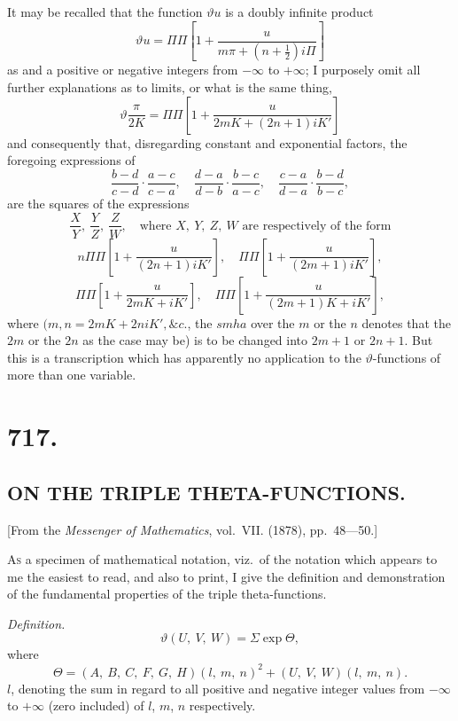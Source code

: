 \documentclass[12pt,a4paper,oneside]{book}
\theoremstyle{plain}
\theoremstyle{definition}
\theoremstyle{remark}
\begin{document}
It may be recalled that the function $\vartheta u$ is a doubly infinite product
\[
\vartheta u=\Pi\Pi\left[1+\frac{u}{m\pi+(n+\frac{1}{2})i\Pi}\right]
\]
as and a positive or negative integers from $-\infty$ to $+\infty$; I purposely omit all further explanations as to limits, or what is the same thing,
\[
\vartheta\frac{\pi}{2K}=\Pi\Pi\left[1+\frac{u}{2mK+(2n+1)iK'}\right]
\]
and consequently that, disregarding constant and exponential factors, the foregoing expressions of
\[
\frac{b-d}{c-d}\cdot\frac{a-c}{c-a},\quad \frac{d-a}{d-b}\cdot\frac{b-c}{a-c},\quad \frac{c-a}{d-a}\cdot\frac{b-d}{b-c},
\]
are the squares of the expressions
\[
\frac{X}{Y},\ \frac{Y}{Z},\ \frac{Z}{W},\quad \text{where } X,\ Y,\ Z,\ W \text{ are respectively of the form}
\]
\[
n\Pi\Pi\left[1+\frac{u}{(2n+1)iK'}\right],\quad \Pi\Pi\left[1+\frac{u}{(2m+1)iK'}\right],
\]
\[
\Pi\Pi\left[1+\frac{u}{2mK+iK'}\right],\quad \Pi\Pi\left[1+\frac{u}{(2m+1)K+iK'}\right],
\]
where $(m, n=2mK+2niK', \&c.$, the $smha$ over the $m$ or the $n$ denotes that the $2m$ or the $2n$ as the case may be) is to be changed into $2m+1$ or $2n+1$. But this is a transcription which has apparently no application to the $\vartheta$-functions of more than one variable.

\newpage
\section*{717.}
\subsection*{ON THE TRIPLE THETA-FUNCTIONS.}

\begin{center}
\small [From the \textit{Messenger of Mathematics}, vol.~VII. (1878), pp.~48---50.]
\end{center}

\medskip

\textsc{As} a specimen of mathematical notation, viz.\ of the notation which appears to me the easiest to read, and also to print, I give the definition and demonstration of the fundamental properties of the triple theta-functions.

\textit{Definition.}
\[
\vartheta(U,\ V,\ W)=\Sigma\exp\Theta,
\]
where
\[
\Theta=(A,\ B,\ C,\ F,\ G,\ H)(l,\ m,\ n)^2+(U,\ V,\ W)(l,\ m,\ n).
\]
$l$, denoting the sum in regard to all positive and negative integer values from $-\infty$ to $+\infty$ (zero included) of $l$, $m$, $n$ respectively.
\end{document}
